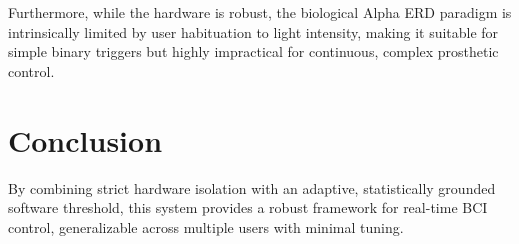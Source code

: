 \documentclass[journal, a4paper]{IEEEtran}
\begin{document}
Furthermore, while the hardware is robust, the biological Alpha ERD paradigm is intrinsically limited by user habituation to light intensity, making it suitable for simple binary triggers but highly impractical for continuous, complex prosthetic control.

\section{Conclusion}
By combining strict hardware isolation with an adaptive, statistically grounded software threshold, this system provides a robust framework for real-time BCI control, generalizable across multiple users with minimal tuning.

\balance

\end{document}
